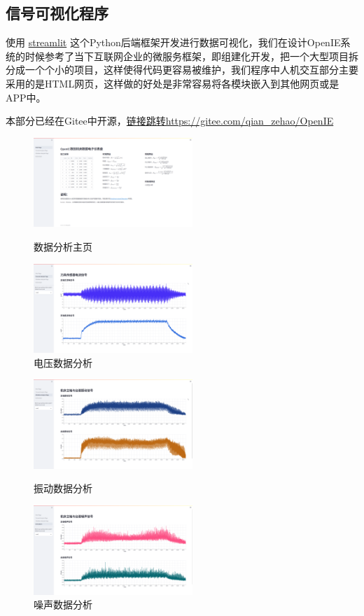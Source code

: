 \subsection{信号可视化程序}
使用 \href{https://streamlit.io/}{streamlit} 这个Python后端框架开发进行数据可视化，我们在设计OpenIE系统的时候参考了当下互联网企业的微服务框架，即组建化开发，把一个大型项目拆分成一个个小的项目，这样使得代码更容易被维护，我们程序中人机交互部分主要采用的是HTML网页，这样做的好处是非常容易将各模块嵌入到其他网页或是APP中。\par
本部分已经在Gitee中开源，\href{https://gitee.com/qian_zehao/OpenIE}{链接跳转https://gitee.com/qian\_zehao/OpenIE} \par
\begin{figure}[htbp]
\begin{minipage}[t]{0.48\textwidth}
\centering
\includegraphics[width=6cm]{Chapter5/mainpage.jpeg}
\caption{数据分析主页}
\end{minipage}
\begin{minipage}[t]{0.48\textwidth}
\centering
\includegraphics[width=6cm]{Chapter5/current.jpeg}
  \caption{电压数据分析}
\end{minipage}
\end{figure}
% 
% 
\begin{figure}[htbp]
\begin{minipage}[t]{0.48\textwidth}
\centering
\includegraphics[width=6cm]{Chapter5/vib.jpeg}
\caption{振动数据分析}
\end{minipage}
\begin{minipage}[t]{0.48\textwidth}
\centering
\includegraphics[width=6cm]{Chapter5/noise.jpeg}
  \caption{噪声数据分析}
\end{minipage}
\end{figure}
% 
